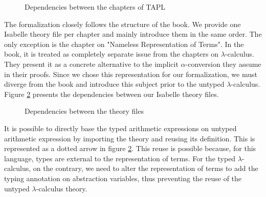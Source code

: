 \begin{figure}[h]
  \begin{center}
  \end{center}
  \caption{Dependencies between the chapters of TAPL}
  \label{fig:TAPL-dependencies}
\end{figure}

The formalization closely follows the structure of the book. We provide one Isabelle theory file per
chapter and mainly introduce them in the same order. The only exception is the chapter on "Nameless
Representation of Terms". In the book, it is treated as completely separate issue from the chapters
on $\lambda$-calculus. They present it as a concrete alternative to the implicit $\alpha$-conversion
they assume in their proofs. Since we chose this representation for our formalization, we must
diverge from the book and introduce this subject prior to the untyped $\lambda$-calculus. Figure
\ref{fig:thys-dependencies} presents the dependencies between our Isabelle theory files.

\begin{figure}[h]
  \begin{center}
  \end{center}
  \caption{Dependencies between the theory files}
  \label{fig:thys-dependencies}
\end{figure}

It is possible to directly base the typed arithmetic expressions on untyped arithmetic expression by
importing the theory and reusing its definition. This is represented as a dotted arrow in figure
\ref{fig:thys-dependencies}. This reuse is possible because, for this language, types are external
to the representation of terms. For the typed $\lambda$-calculus, on the contrary, we need to alter
the representation of terms to add the typing annotation on abstraction variables, thus preventing
the reuse of the untyped $\lambda$-calculus theory.
